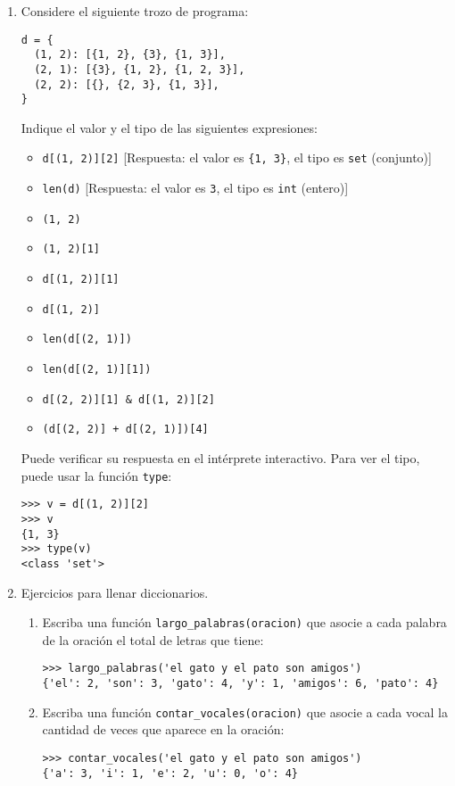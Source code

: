 \documentclass[10pt,spanish]{article}
\begin{document}
\begin{enumerate}
    \item
      Considere el siguiente trozo de programa:
\begin{lstlisting}
d = {
  (1, 2): [{1, 2}, {3}, {1, 3}],
  (2, 1): [{3}, {1, 2}, {1, 2, 3}],
  (2, 2): [{}, {2, 3}, {1, 3}],
}
\end{lstlisting}
      Indique el valor y el tipo de las siguientes expresiones:
      \begin{itemize}
        \item \lstinline!d[(1, 2)][2]!
          \hfill
          [Respuesta: el valor es \lstinline!{1, 3}!,
          el tipo es \lstinline!set! (conjunto)]
        \item \lstinline!len(d)!
          \hfill
          [Respuesta: el valor es \lstinline!3!,
          el tipo es \lstinline!int! (entero)]
        \item \lstinline!(1, 2)!
        \item \lstinline!(1, 2)[1]!
        \item \lstinline!d[(1, 2)][1]!
        \item \lstinline!d[(1, 2)]!
        \item \lstinline!len(d[(2, 1)])!
        \item \lstinline!len(d[(2, 1)][1])!
        \item \lstinline!d[(2, 2)][1] & d[(1, 2)][2]!
        \item \lstinline!(d[(2, 2)] + d[(2, 1)])[4]!
      \end{itemize}

      Puede verificar su respuesta en el intérprete interactivo.
      Para ver el tipo, puede usar la función \lstinline+type+:
\begin{lstlisting}
>>> v = d[(1, 2)][2]
>>> v
{1, 3}
>>> type(v)
<class 'set'>
\end{lstlisting}

    \item Ejercicios para llenar diccionarios.
      \begin{enumerate}
        \item 
          Escriba una función \lstinline+largo_palabras(oracion)+
          que asocie a cada palabra de la oración
          el total de letras que tiene:
\begin{lstlisting}
>>> largo_palabras('el gato y el pato son amigos')
{'el': 2, 'son': 3, 'gato': 4, 'y': 1, 'amigos': 6, 'pato': 4}
\end{lstlisting}
        \item 
          Escriba una función \lstinline+contar_vocales(oracion)+
          que asocie a cada vocal
          la cantidad de veces que aparece en la oración:
\begin{lstlisting}
>>> contar_vocales('el gato y el pato son amigos')
{'a': 3, 'i': 1, 'e': 2, 'u': 0, 'o': 4}
\end{lstlisting}
      \end{enumerate}


\end{enumerate}
\end{document}
